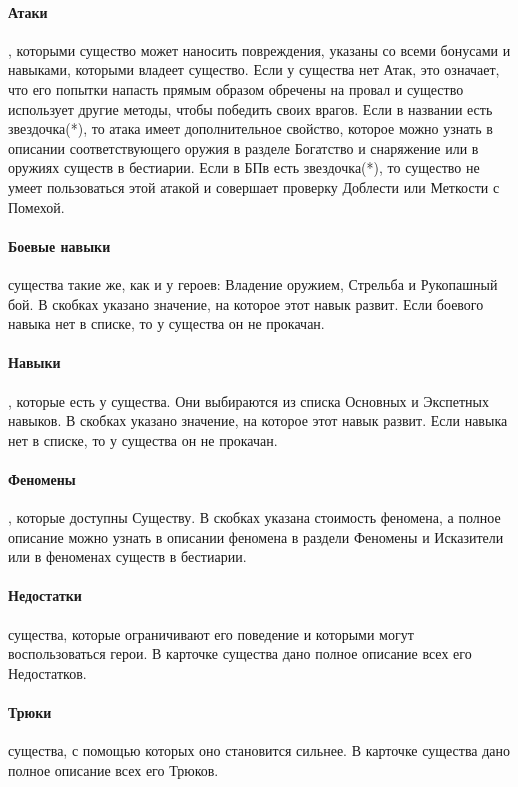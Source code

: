 \paragraph{Атаки}, которыми существо может наносить повреждения, указаны со всеми бонусами и навыками, которыми владеет существо. Если у существа нет Атак, это означает, что его попытки напасть прямым образом обречены на провал и существо использует другие методы, чтобы победить своих врагов.
\newline Если в названии есть звездочка(*), то атака имеет дополнительное свойство, которое можно узнать в описании соответствующего оружия в разделе Богатство и снаряжение или в оружиях существ в бестиарии.
\newline Если в БПв есть звездочка(*), то существо не умеет пользоваться этой атакой и совершает проверку Доблести или Меткости с Помехой.

\paragraph{Боевые навыки} существа такие же, как и у героев: Владение оружием, Стрельба и Рукопашный бой. В скобках указано значение, на которое этот навык развит. Если боевого навыка нет в списке, то у существа он не прокачан.
\paragraph{Навыки}, которые есть у существа. Они выбираются из списка Основных и Экспетных навыков. В скобках указано значение, на которое этот навык развит. Если навыка нет в списке, то у существа он не прокачан.
\paragraph{Феномены}, которые доступны Существу. В скобках указана стоимость феномена, а полное описание можно узнать в описании феномена в раздели Феномены и Исказители или в феноменах существ в бестиарии.
\paragraph{Недостатки} существа, которые ограничивают его поведение и которыми могут воспользоваться герои. В карточке существа дано полное описание всех его Недостатков.
\paragraph{Трюки} существа, с помощью которых оно становится сильнее. В карточке существа дано полное описание всех его Трюков.
